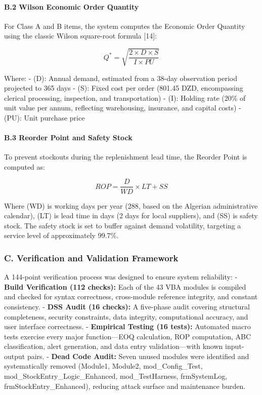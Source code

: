 ﻿\documentclass[conference]{IEEEtran}
\begin{document}
\paragraph{B.2 Wilson Economic Order
Quantity}\label{b.2-wilson-economic-order-quantity}

For Class A and B items, the system computes the Economic Order Quantity
using the classic Wilson square-root formula {[}14{]}:

\[Q^{*} = \sqrt{\frac{2 \times D \times S}{I \times PU}}\]

Where: - (D): Annual demand, estimated from a 38-day observation period
projected to 365 days - (S): Fixed cost per order (801.45 DZD,
encompassing clerical processing, inspection, and transportation) - (I):
Holding rate (20\% of unit value per annum, reflecting warehousing,
insurance, and capital costs) - (PU): Unit purchase price

\paragraph{B.3 Reorder Point and Safety
Stock}\label{b.3-reorder-point-and-safety-stock}

To prevent stockouts during the replenishment lead time, the Reorder
Point is computed as:

\[ROP = \frac{D}{WD} \times LT + SS\]

Where (WD) is working days per year (288, based on the Algerian
administrative calendar), (LT) is lead time in days (2 days for local
suppliers), and (SS) is safety stock. The safety stock is set to buffer
against demand volatility, targeting a service level of approximately
99.7\%.

\subsubsection{C. Verification and Validation
Framework}\label{c.-verification-and-validation-framework}

A 144-point verification process was designed to ensure system
reliability: - \textbf{Build Verification (112 checks):} Each of the 43
VBA modules is compiled and checked for syntax correctness, cross-module
reference integrity, and constant consistency. - \textbf{DSS Audit (16
checks):} A five-phase audit covering structural completeness, security
constraints, data integrity, computational accuracy, and user interface
correctness. - \textbf{Empirical Testing (16 tests):} Automated macro
tests exercise every major function---EOQ calculation, ROP computation,
ABC classification, alert generation, and data entry validation---with
known input-output pairs. - \textbf{Dead Code Audit:} Seven unused
modules were identified and systematically removed (Module1, Module2,
mod\_Config\_Test, mod\_StockEntry\_Logic\_Enhanced, mod\_TestHarness,
frmSystemLog, frmStockEntry\_Enhanced), reducing attack surface and
maintenance burden.
\end{document}
